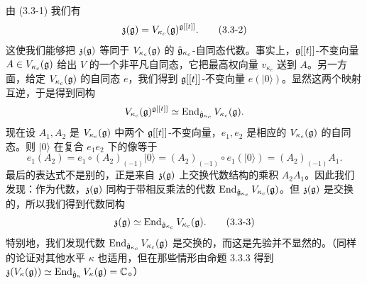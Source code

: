 由 (3.3-1) 我们有
\begin{equation}
    \mathfrak z(\mathfrak{g}) = V_{\kappa_c}(\mathfrak{g})^{\mathfrak{g}[[t]]}.
    \tag{3.3-2}
\end{equation}
这使我们能够把 $\mathfrak z(\mathfrak{g})$ 等同于 $V_{\kappa_c}(\mathfrak{g})$ 的 $\hat{\mathfrak{g}}_{\kappa_c}$-自同态代数。事实上，$\mathfrak{g}[[t]]$-不变向量 $A\in V_{\kappa_c}(\mathfrak{g})$ 给出 $V$ 的一个非平凡自同态，它把最高权向量 $v_{\kappa_c}$ 送到 $A$。另一方面，给定 $V_{\kappa_c}(\mathfrak{g})$ 的自同态 $e$，我们得到 $\mathfrak{g}[[t]]$-不变向量 $e(|0\rangle)$。显然这两个映射互逆，于是得到同构
\[
    V_{\kappa_c}(\mathfrak{g})^{\mathfrak{g}[[t]]} \simeq \operatorname{End}_{\hat{\mathfrak{g}}_{\kappa_c}} V_{\kappa_c}(\mathfrak{g}).
\]
现在设 $A_1,A_2$ 是 $V_{\kappa_c}(\mathfrak{g})$ 中两个 $\mathfrak{g}[[t]]$-不变向量，$e_1,e_2$ 是相应的 $V_{\kappa_c}(\mathfrak{g})$ 的自同态。则 $|0\rangle$ 在复合 $e_1e_2$ 下的像等于
\[
    e_1(A_2) = e_1\circ (A_2)_{(-1)}|0\rangle
    = (A_2)_{(-1)}\circ e_1(|0\rangle)
    = (A_2)_{(-1)}A_1.
\]
最后的表达式不是别的，正是来自 $\mathfrak z(\mathfrak{g})$ 上交换代数结构的乘积 $A_2A_1$。因此我们发现：作为代数，$\mathfrak z(\mathfrak{g})$ 同构于带相反乘法的代数 $\operatorname{End}_{\hat{\mathfrak{g}}_{\kappa_c}}V_{\kappa_c}(\mathfrak{g})$。但 $\mathfrak z(\mathfrak{g})$ 是交换的，所以我们得到代数同构
\begin{equation}
    \mathfrak z(\mathfrak{g}) \simeq \operatorname{End}_{\hat{\mathfrak{g}}_{\kappa_c}} V_{\kappa_c}(\mathfrak{g}).
    \tag{3.3-3}
\end{equation}
特别地，我们发现代数 $\operatorname{End}_{\hat{\mathfrak{g}}_{\kappa_c}}V_{\kappa_c}(\mathfrak{g})$ 是交换的，而这是先验并不显然的。（同样的论证对其他水平 $\kappa$ 也适用，但在那些情形由命题 3.3.3 得到 $\mathfrak z(V_\kappa(\mathfrak{g}))\simeq\operatorname{End}_{\hat{\mathfrak{g}}_\kappa}V_\kappa(\mathfrak{g})=\mathbb{C}$。）


